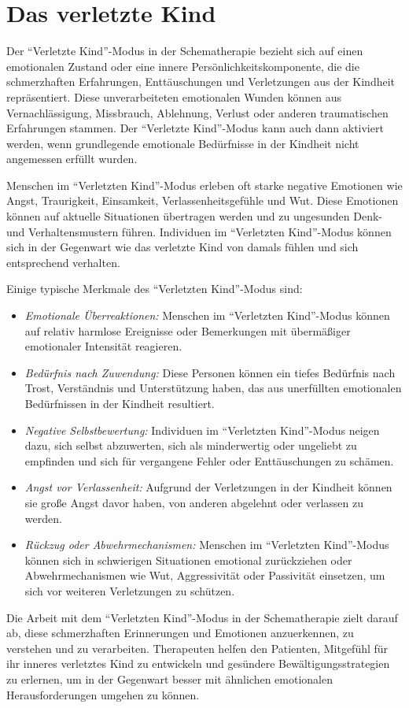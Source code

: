 \section{Das verletzte Kind}
Der \enquote{Verletzte Kind}-Modus in der Schematherapie bezieht sich auf einen emotionalen Zustand oder eine innere Persönlichkeitskomponente, die die schmerzhaften Erfahrungen, Enttäuschungen und Verletzungen aus der Kindheit repräsentiert. Diese unverarbeiteten emotionalen Wunden können aus Vernachlässigung, Missbrauch, Ablehnung, Verlust oder anderen traumatischen Erfahrungen stammen. Der \enquote{Verletzte Kind}-Modus kann auch dann aktiviert werden, wenn grundlegende emotionale Bedürfnisse in der Kindheit nicht angemessen erfüllt wurden.

Menschen im \enquote{Verletzten Kind}-Modus erleben oft starke negative Emotionen wie Angst, Traurigkeit, Einsamkeit, Verlassenheitsgefühle und Wut. Diese Emotionen können auf aktuelle Situationen übertragen werden und zu ungesunden Denk- und Verhaltensmustern führen. Individuen im \enquote{Verletzten Kind}-Modus können sich in der Gegenwart wie das verletzte Kind von damals fühlen und sich entsprechend verhalten.

Einige typische Merkmale des \enquote{Verletzten Kind}-Modus sind:
\begin{itemize}
    \item \emph{Emotionale Überreaktionen:} Menschen im \enquote{Verletzten Kind}-Modus können auf relativ harmlose Ereignisse oder Bemerkungen mit übermäßiger emotionaler Intensität reagieren. 
    \item \emph{Bedürfnis nach Zuwendung:} Diese Personen können ein tiefes Bedürfnis nach Trost, Verständnis und Unterstützung haben, das aus unerfüllten emotionalen Bedürfnissen in der Kindheit resultiert.
    \item \emph{Negative Selbstbewertung:} Individuen im \enquote{Verletzten Kind}-Modus neigen dazu, sich selbst abzuwerten, sich als minderwertig oder ungeliebt zu empfinden und sich für vergangene Fehler oder Enttäuschungen zu schämen.
    \item \emph{Angst vor Verlassenheit:} Aufgrund der Verletzungen in der Kindheit können sie große Angst davor haben, von anderen abgelehnt oder verlassen zu werden.
    \item  \emph{Rückzug oder Abwehrmechanismen:} Menschen im \enquote{Verletzten Kind}-Modus können sich in schwierigen Situationen emotional zurückziehen oder Abwehrmechanismen wie Wut, Aggressivität oder Passivität einsetzen, um sich vor weiteren Verletzungen zu schützen.    
\end{itemize}
Die Arbeit mit dem \enquote{Verletzten Kind}-Modus in der Schematherapie zielt darauf ab, diese schmerzhaften Erinnerungen und Emotionen anzuerkennen, zu verstehen und zu verarbeiten. Therapeuten helfen den Patienten, Mitgefühl für ihr inneres verletztes Kind zu entwickeln und gesündere Bewältigungsstrategien zu erlernen, um in der Gegenwart besser mit ähnlichen emotionalen Herausforderungen umgehen zu können.




